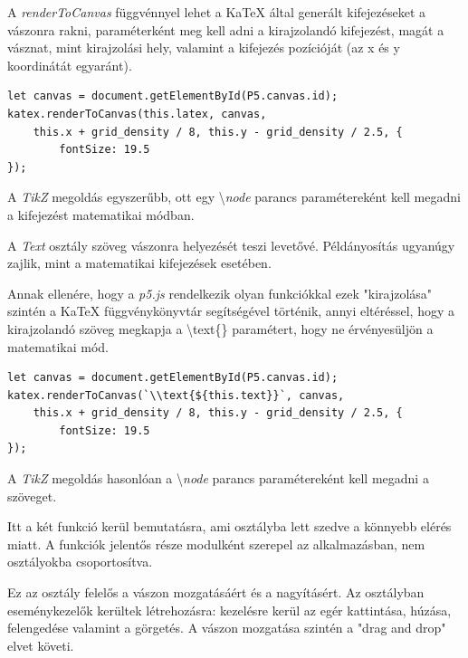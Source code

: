 A \textit{renderToCanvas} függvénnyel lehet a KaTeX által generált kifejezéseket a vászonra rakni, paraméterként meg kell adni a kirajzolandó kifejezést, magát a vásznat, mint kirajzolási hely, valamint a kifejezés pozícióját (az x és y koordinátát egyaránt).

\begin{lstlisting}[style=es6, morekeywords={document, P5, katex}]
let canvas = document.getElementById(P5.canvas.id);
katex.renderToCanvas(this.latex, canvas, 
    this.x + grid_density / 8, this.y - grid_density / 2.5, {
	    fontSize: 19.5
});
\end{lstlisting}

A \textit{TikZ} megoldás egyszerűbb, ott egy \textbackslash \textit{node} parancs paramétereként kell megadni a kifejezést matematikai módban.


A \textit{Text} osztály szöveg vászonra helyezését teszi levetővé. Példányosítás ugyanúgy zajlik, mint a matematikai kifejezések esetében.

Annak ellenére, hogy a \textit{p5.js} rendelkezik olyan funkciókkal ezek "kirajzolása" szintén a KaTeX függvénykönyvtár segítségével történik, annyi eltéréssel, hogy a kirajzolandó szöveg megkapja a \textbackslash text\{\} paramétert, hogy ne érvényesüljön a matematikai mód.

\begin{lstlisting}[style=es6, morekeywords={document, P5, katex}]
let canvas = document.getElementById(P5.canvas.id);
katex.renderToCanvas(`\\text{${this.text}}`, canvas, 
    this.x + grid_density / 8, this.y - grid_density / 2.5, {
	    fontSize: 19.5
});
\end{lstlisting}

A \textit{TikZ} megoldás hasonlóan a \textbackslash \textit{node} parancs paramétereként kell megadni a szöveget.


Itt a két funkció kerül bemutatásra, ami osztályba lett szedve a könnyebb elérés miatt. A funkciók jelentős része modulként szerepel az alkalmazásban, nem osztályokba csoportosítva.


Ez az osztály felelős a vászon mozgatásáért és a nagyításért. Az osztályban eseménykezelők kerültek létrehozásra: kezelésre kerül az egér kattintása, húzása, felengedése valamint a görgetés. A vászon mozgatása szintén a "drag and drop" elvet követi.


